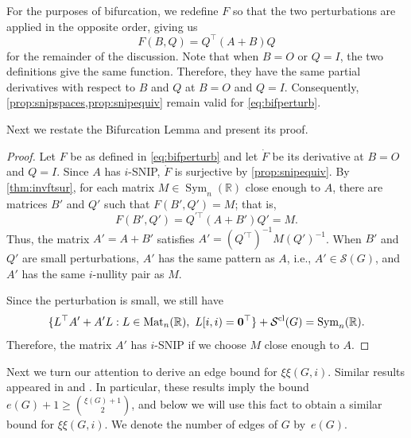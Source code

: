 \documentclass{article}
\theoremstyle{definition}
\newcommand{\trans}{^\top}
\newcommand{\bzero}{\mathbf{0}}
\newcommand{\mptn}{\mathcal{S}} %
\newcommand{\mptncl}{\mathcal{S}^{\rm cl}}
\newcommand{\excise}{\xi\xi}
\newcommand{\mat}[1][n]{\operatorname{Mat}_{#1}(\mathbb{R})}
\newcommand{\msym}[1][n]{\operatorname{Sym}_{#1}(\mathbb{R})}
\begin{document}
For the purposes of bifurcation, we redefine $F$ so that the two perturbations are applied in the opposite order,
giving us
\begin{equation}
\label{eq:bifperturb}
    F(B,Q) = Q\trans (A + B)Q
\end{equation}
for the remainder of the discussion.  Note that when $B = O$ or $Q = I$, the two definitions give the same function.
Therefore, they have the same partial derivatives with respect to $B$ and $Q$ at $B = O$ and $Q = I$.  Consequently, \cref{prop:snipspaces,prop:snipequiv} remain valid for \cref{eq:bifperturb}.

Next we restate the Bifurcation Lemma and present its proof.

\bifurcation*

\begin{proof}
Let $F$ be as defined in \cref{eq:bifperturb} and let $\dot{F}$ be its derivative at $B = O$ and $Q = I$.  Since $A$ has $i$-SNIP, $\dot{F}$ is surjective by \cref{prop:snipequiv}.  By \cref{thm:invftsur}, for each matrix $M\in\msym$ close enough to $A$, there are matrices $B'$ and $Q'$ such that $F(B',Q') = M$; that is,
\[
    F(B',Q') = Q^{\prime\top}(A + B')Q' = M.
\]
Thus, the matrix $A' = A + B'$ satisfies $A' = (Q^{\prime\top})^{-1}M(Q')^{-1}$. 
 When $B'$ and $Q'$ are small perturbations, $A'$ has the same pattern as $A$, i.e., $A'\in\mptn(G)$, and $A'$ has the same $i$-nullity pair as $M$.  

Since the perturbation is small, we still have   
\[
    \{L\trans A' + A'L: L\in\mat,\ L[i,i) = \bzero\trans\} + \mptncl(G) = \msym.
\]
Therefore, the matrix $A'$ has $i$-SNIP if we choose $M$ close enough to $A$.
\end{proof}

Next we turn our attention to derive an edge bound for $\excise(G,i)$.  Similar results appeared in \cite[Theorem~6.5]{HHMS10} and \cite[Corollary~29]{gSAP}. In particular, these results imply the bound $e(G) + 1 \geq \binom{\xi(G) + 1}{2}$, and below we will use this fact to obtain a similar bound for $\excise(G,i)$.
We denote the number of edges of $G$ by~$e(G)$.
\end{document}
